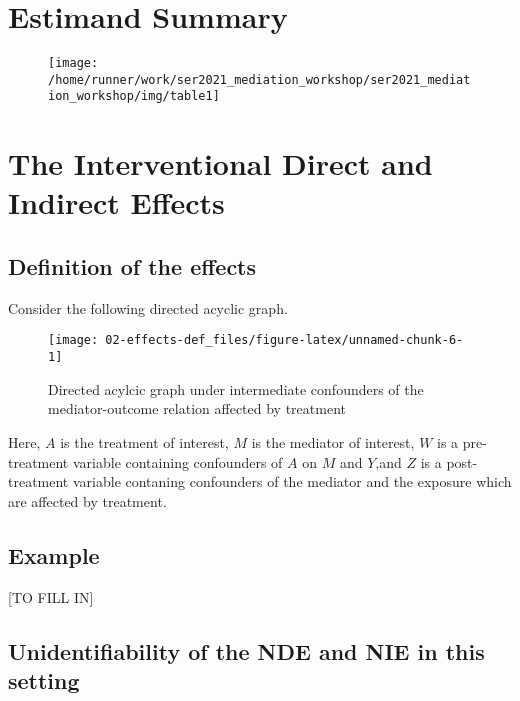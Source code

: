 \documentclass[
  12pt,
]{book}
\theoremstyle{definition}
\theoremstyle{definition}
\theoremstyle{definition}
\newcommand{\1}{\mathbbm{1}}
\begin{document}
\hypertarget{estimand-summary}{%
\section{Estimand Summary}\label{estimand-summary}}

\begin{figure}

{\centering \texttt{[image: /home/runner/work/ser2021\_mediation\_workshop/ser2021\_mediation\_workshop/img/table1]} 

}

\end{figure}

\hypertarget{interventional}{%
\section{The Interventional Direct and Indirect Effects}\label{interventional}}

\hypertarget{definition-of-the-effects}{%
\subsection{Definition of the effects}\label{definition-of-the-effects}}

Consider the following directed acyclic graph.

\begin{figure}

{\centering \texttt{[image: 02-effects-def\_files/figure-latex/unnamed-chunk-6-1]} 

}

\caption{Directed acylcic graph under intermediate confounders of the mediator-outcome relation affected by treatment}\label{fig:unnamed-chunk-6}
\end{figure}

Here, \(A\) is the treatment of interest, \(M\) is the mediator of
interest, \(W\) is a pre-treatment variable containing confounders of
\(A\) on \(M\) and \(Y\),and \(Z\) is a post-treatment variable contaning
confounders of the mediator and the exposure which are affected by
treatment.

\hypertarget{example}{%
\subsection{Example}\label{example}}

{[}TO FILL IN{]}

\hypertarget{unidentifiability-of-the-nde-and-nie-in-this-setting}{%
\subsection{Unidentifiability of the NDE and NIE in this setting}\label{unidentifiability-of-the-nde-and-nie-in-this-setting}}
\end{document}
